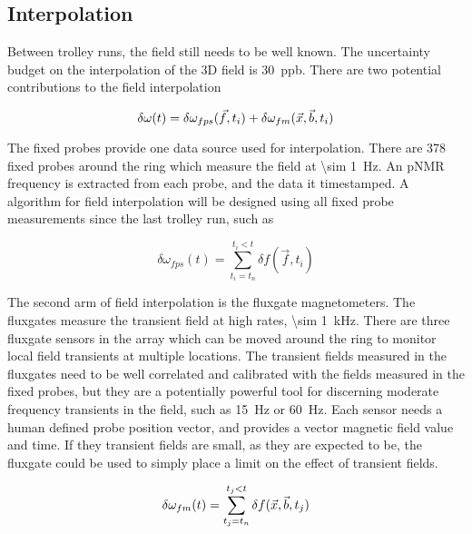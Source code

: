 
\subsection{Interpolation}

Between trolley runs, the field still needs to be well known.  The uncertainty budget on the interpolation of the 3D field is \SI{30}{ppb}.  There are two potential contributions to the field interpolation

\begin{equation}
\label{eqn:field-interpolation}
\delta \omega(t) = \delta \omega_{fps}(\vec{f}, t_i) \\
+ \delta \omega_{fm}(\vec{x}, \vec{b}, t_i)
\end{equation}

The fixed probes provide one data source used for interpolation.  There are 378 fixed probes around the ring which measure the field at \SI{\sim 1}{\Hz}.  An pNMR frequency is extracted from each probe, and the data it timestamped.  A algorithm for field interpolation will be designed using all fixed probe measurements since the last trolley run, such as

\begin{equation}
\label{eqn:field-interpolation-fps}
\delta \omega_{fps}(t) = \sum_{t_i = t_n}^{t_i < t} \delta f(\vec{f}, t_i)
\end{equation}

The second arm of field interpolation is the fluxgate magnetometers.  The fluxgates measure the transient field at high rates, \SI{\sim 1}{\kHz}.  There are three fluxgate sensors in the array which can be moved around the ring to monitor local field transients at multiple locations.  The transient fields measured in the fluxgates need to be well correlated and calibrated with the fields measured in the fixed probes, but they are a potentially powerful tool for discerning moderate frequency transients in the field, such as \SI{15}{\Hz} or \SI{60}{\Hz}.  Each sensor needs a human defined probe position vector, and provides a vector magnetic field value and time.  If they transient fields are small, as they are expected to be, the fluxgate could be used to simply place a limit on the effect of transient fields.

\begin{equation}
\label{eqn:field-interpolation-fm}
\delta \omega_{fm}(t) \\
= \sum_{t_j = t_n}^{t_j < t} \delta f(\vec{x}, \vec{b}, t_j)
\end{equation}

